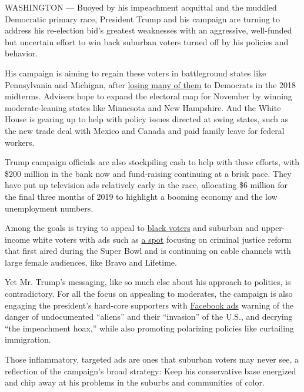 WASHINGTON --- Buoyed by his impeachment acquittal and the muddled
Democratic primary race, President Trump and his campaign are turning to
address his re-election bid's greatest weaknesses with an aggressive,
well-funded but uncertain effort to win back suburban voters turned off
by his policies and behavior.

His campaign is aiming to regain these voters in battleground states
like Pennsylvania and Michigan, after
\href{https://www.nytimes3xbfgragh.onion/2018/11/01/us/politics/republicans-trump-house.html}{losing
many of them} to Democrats in the 2018 midterms. Advisers hope to expand
the electoral map for November by winning moderate-leaning states like
Minnesota and New Hampshire. And the White House is gearing up to help
with policy issues directed at swing states, such as the new trade deal
with Mexico and Canada and paid family leave for federal workers.

Trump campaign officials are also stockpiling cash to help with these
efforts, with \$200 million in the bank now and fund-raising continuing
at a brisk pace. They have put up television ads relatively early in the
race, allocating \$6 million for the final three months of 2019 to
highlight a booming economy and the low unemployment numbers.

Among the goals is trying to appeal to
\href{https://www.nytimes3xbfgragh.onion/2020/02/04/us/politics/trump-super-bowl-ad.html}{black
voters} and suburban and upper-income white voters with ads such as
\href{https://www.nytimes3xbfgragh.onion/2018/06/06/us/politics/trump-alice-johnson-sentence-commuted-kim-kardashian-west.html}{a
spot} focusing on criminal justice reform that first aired during the
Super Bowl and is continuing on cable channels with large female
audiences, like Bravo and Lifetime.

Yet Mr. Trump's messaging, like so much else about his approach to
politics, is contradictory. For all the focus on appealing to moderates,
the campaign is also engaging the president's hard-core supporters with
\href{https://www.nytimes3xbfgragh.onion/2019/10/20/us/elections/trump-campaign-ads-democrats.html}{Facebook
ads} warning of the danger of undocumented ``aliens'' and their
``invasion'' of the U.S., and decrying ``the impeachment hoax,'' while
also promoting polarizing policies like curtailing immigration.

Those inflammatory, targeted ads are ones that suburban voters may never
see, a reflection of the campaign's broad strategy: Keep his
conservative base energized and chip away at his problems in the suburbs
and communities of color.


